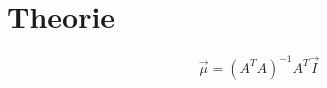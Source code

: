 \section{Theorie}
\label{sec:Theorie}

\begin{equation}
    \vec{\mu} = \left(A^T A\right)^{-1}A^T\vec{I}
    \label{eqn:Abs}
\end{equation}

\cite{sample}
